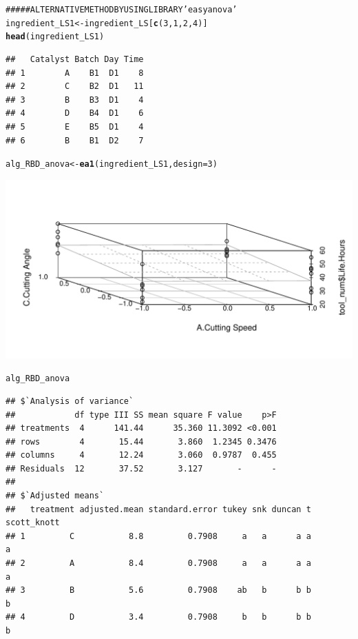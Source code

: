 \documentclass[a4paper]{article}\usepackage{graphicx, color}
\makeatletter
\def\maxwidth{ %
  \ifdim\Gin@nat@width>\linewidth
    \linewidth
  \else
    \Gin@nat@width
  \fi
}
\newcommand{\hlfunctioncall}[1]{\textcolor[rgb]{0.501960784313725,0,0.329411764705882}{\textbf{#1}}}%
\newcommand{\hlcomment}[1]{\textcolor[rgb]{0.180392156862745,0.6,0.341176470588235}{#1}}%
\newenvironment{kframe}{%
 \def\at@end@of@kframe{}%
 \ifinner\ifhmode%
  \def\at@end@of@kframe{\end{minipage}}%
  \begin{minipage}{\columnwidth}%
 \fi\fi%
 \def\FrameCommand##1{\hskip\@totalleftmargin \hskip-\fboxsep
 \colorbox{shadecolor}{##1}\hskip-\fboxsep
     \hskip-\linewidth \hskip-\@totalleftmargin \hskip\columnwidth}%
 \MakeFramed {\advance\hsize-\width
   \@totalleftmargin\z@ \linewidth\hsize
   \@setminipage}}%
 {\par\unskip\endMakeFramed%
 \at@end@of@kframe}
\newenvironment{knitrout}{}{} %
\makeatother
\begin{document}
\begin{knitrout}
\color{fgcolor}\begin{kframe}
\begin{alltt}
\hlcomment{##### ALTERNATIVE METHOD BY USING LIBRARY 'easyanova'}
ingredient_LS1 <- ingredient_LS[\hlfunctioncall{c}(3, 1, 2, 4)]
\hlfunctioncall{head}(ingredient_LS1)
\end{alltt}
\begin{verbatim}
##   Catalyst Batch Day Time
## 1        A    B1  D1    8
## 2        C    B2  D1   11
## 3        B    B3  D1    4
## 4        D    B4  D1    6
## 5        E    B5  D1    4
## 6        B    B1  D2    7
\end{verbatim}
\begin{alltt}
alg_RBD_anova <- \hlfunctioncall{ea1}(ingredient_LS1, design = 3)
\end{alltt}
\end{kframe}
\includegraphics[width=\maxwidth]{figure/unnamed-chunk-8} 
\begin{kframe}\begin{alltt}
alg_RBD_anova
\end{alltt}
\begin{verbatim}
## $`Analysis of variance`
##            df type III SS mean square F value    p>F
## treatments  4      141.44      35.360 11.3092 <0.001
## rows        4       15.44       3.860  1.2345 0.3476
## columns     4       12.24       3.060  0.9787  0.455
## Residuals  12       37.52       3.127       -      -
## 
## $`Adjusted means`
##   treatment adjusted.mean standard.error tukey snk duncan t scott_knott
## 1         C           8.8         0.7908     a   a      a a           a
## 2         A           8.4         0.7908     a   a      a a           a
## 3         B           5.6         0.7908    ab   b      b b           b
## 4         D           3.4         0.7908     b   b      b b           b

\end{verbatim}
\end{kframe}
\end{knitrout}
\end{document}

